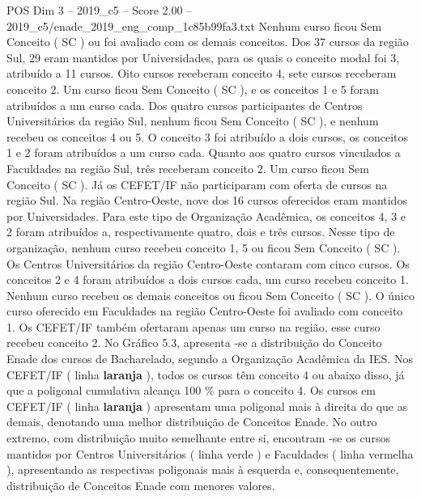\begin{textsample}{POS Dim 3 – 2019\_c5 – Score 2.00 – 2019\_c5/enade\_2019\_eng\_comp\_1c85b99fa3.txt}
Nenhum curso ficou Sem Conceito ( SC ) ou foi avaliado com os demais conceitos.
Dos 37 cursos da região Sul, 29 eram mantidos por Universidades, para os quais o conceito modal foi 3, atribuído a 11 cursos.
Oito cursos receberam conceito 4, sete cursos receberam conceito 2.
Um curso ficou Sem Conceito ( SC ), e os conceitos 1 e 5 foram atribuídos a um curso cada.
Dos quatro cursos participantes de Centros Universitários da região Sul, nenhum ficou Sem Conceito ( SC ), e nenhum recebeu os conceitos 4 ou 5.
O conceito 3 foi atribuído a dois cursos, os conceitos 1 e 2 foram atribuídos a um curso cada.
Quanto aos quatro cursos vinculados a Faculdades na região Sul, três receberam conceito 2.
Um curso ficou Sem Conceito ( SC ).
Já os CEFET/IF não participaram com oferta de cursos na região Sul.
Na região Centro-Oeste, nove dos 16 cursos oferecidos eram mantidos por Universidades.
Para este tipo de Organização Acadêmica, os conceitos 4, 3 e 2 foram atribuídos a, respectivamente quatro, dois e três cursos.
Nesse tipo de organização, nenhum curso recebeu conceito 1, 5 ou ficou Sem Conceito ( SC ).
Os Centros Universitários da região Centro-Oeste contaram com cinco cursos.
Os conceitos 2 e 4 foram atribuídos a dois cursos cada, um curso recebeu conceito 1.
Nenhum curso recebeu os demais conceitos ou ficou Sem Conceito ( SC ).
O único curso oferecido em Faculdades na região Centro-Oeste foi avaliado com conceito 1.
Os CEFET/IF também ofertaram apenas um curso na região, esse curso recebeu conceito 2.
No Gráfico 5.3, apresenta -se a distribuição do Conceito Enade dos cursos de Bacharelado, segundo a Organização Acadêmica da IES.
Nos CEFET/IF ( linha \textbf{laranja} ), todos os cursos têm conceito 4 ou abaixo disso, já que a poligonal cumulativa alcança 100 \% para o conceito 4.
Os cursos em CEFET/IF ( linha \textbf{laranja} ) apresentam uma poligonal mais à direita do que as demais, denotando uma melhor distribuição de Conceitos Enade.
No outro extremo, com distribuição muito semelhante entre si, encontram -se os cursos mantidos por Centros Universitários ( linha verde ) e Faculdades ( linha vermelha ), apresentando as respectivas poligonais mais à esquerda e, consequentemente, distribuição de Conceitos Enade com menores valores.

\end{textsample}
